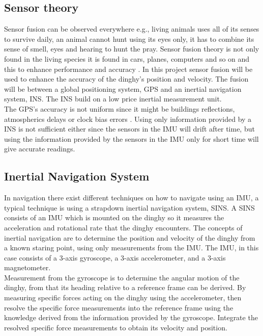 \subsection*{Sensor theory}
Sensor fusion can be observed everywhere e.g., living animals uses all of its senses to survive daily, an animal cannot hunt using its eyes only, it has to combine its sense of smell, eyes and hearing to hunt the pray\cite{animal}. Sensor fusion theory is not only found in the living species it is found in cars, planes, computers and so on and this to enhance performance and accuracy \cite{animal}. In this project sensor fusion will be used to enhance the accuracy of the dinghy's position and velocity. The fusion will be between a global positioning system, GPS and an inertial navigation system, INS. The INS build on a low price inertial measurement unit.\\ 
The GPS's accuracy is not uniform since it might be buildings reflections, atmospherics delays or clock bias errors \cite{boken}. Using only information provided by a INS is not sufficient either since the sensors in the IMU will drift after time, but using the information provided by the sensors in the IMU only for short time will give accurate readings.  

\subsection{Inertial Navigation System}
In navigation there exist different techniques on how to navigate using an IMU, a typical technique is using a strapdown inertial navigation system, SINS. A SINS consists of an IMU which is mounted on the dinghy so it measures the acceleration and rotational rate that the dinghy encounters.
The concepts of inertial navigation are to determine the position and velocity of the dinghy from a known staring point, using only measurements from the IMU. The IMU, in this case consists of a 3-axis gyroscope, a 3-axis accelerometer, and a 3-axis magnetometer. \\
Measurement from the gyroscope is to determine the angular motion of the dinghy, from that its heading relative to a reference frame can be derived.
By measuring specific forces acting on the dinghy using the accelerometer, then resolve the specific force measurements into the reference frame using the knowledge derived from the information provided by the gyroscope. 
Integrate the resolved specific force measurements to obtain its velocity and position. \cite{non-linear} 


